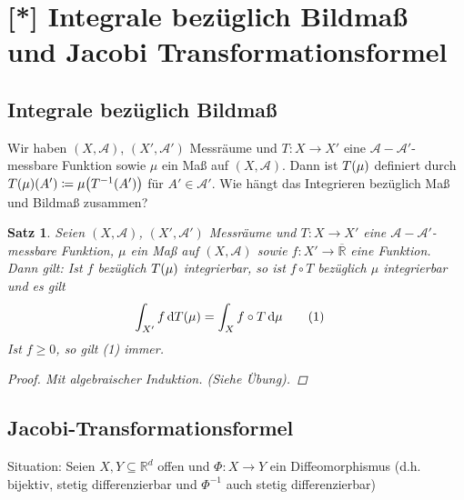 \documentclass[11pt, twoside, a4paper]{article}
\theoremstyle{plain}
\newtheorem{satz}[blockelement]{Satz}
\numberwithin{equation}{subsection}
\newcommand{\pair}[1]{\left(#1\right)}
\newcommand{\of}[1]{\mathopen{}\mathclose{}\bgroup\left(#1\aftergroup\egroup\right)}
\newcommand{\dif}{\mathop{}\!\mathrm{d}}
\newcommand{\R}{\mathbb{R}}
\newcommand{\mA}{\mathcal{A}}
\begin{document}
    \section{[*] Integrale bezüglich Bildmaß und Jacobi Transformationsformel}

    \subsection{Integrale bezüglich Bildmaß}
    \thispagestyle{pagenumberonly}

    Wir haben $\pair{X, \mA}$, $\pair{X', \mA'}$ Messräume und $T: X\to X'$ eine $\mA-\mA'$-messbare Funktion sowie $\mu$ ein Maß auf $\pair{X, \mA}$. Dann ist $T\of{\mu}$ definiert durch $T\of{\mu}\of{A'} \coloneqq \mu\of{T^{-1}\of{A'}}$ für $A'\in\mA'$. Wie hängt das Integrieren bezüglich Maß und Bildmaß zusammen?

    \begin{satz} %
        Seien $\pair{X, \mA}$, $\pair{X', \mA'}$ Messräume und $T: X\to X'$ eine $\mA-\mA'$-messbare Funktion, $\mu$ ein Maß auf $\pair{X, \mA}$ sowie $f: X' \to \overline{\R}$ eine Funktion. Dann gilt: Ist $f$ bezüglich $T\of{\mu}$ integrierbar, so ist $f\circ T$ bezüglich $\mu$ integrierbar und es gilt
        \begin{align*}
            \int_{X'}^{} f\dif T\of{\mu} &= \int_{X}^{} f\circ T \dif \mu\tag{1}
        \end{align*}
        Ist $f\geq 0$, so gilt (1) immer.

        \begin{proof}
            Mit algebraischer Induktion. (Siehe Übung).
        \end{proof}
    \end{satz}

    \subsection{Jacobi-Transformationsformel}

    Situation: Seien $X, Y\subseteq\R^d$ offen und $\Phi: X \to Y$ ein Diffeomorphismus (d.h. bijektiv, stetig differenzierbar und $\Phi^{-1}$ auch stetig differenzierbar)
\end{document}
